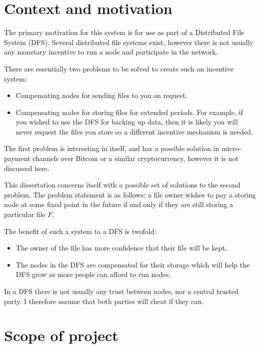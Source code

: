 \documentclass[12pt,a4paper,twoside,openright]{report}
\begin{document}
\section{Context and motivation}

The primary motivation for this system is for use as part of a Distributed File System (DFS).
Several distributed file systems exist, however there is not usually any monetary incentive to run a node and participate in the network.

There are essentially two problems to be solved to create such an incentive system:
\begin{itemize}
\item Compensating nodes for sending files to you on request.

\item Compensating nodes for storing files for extended periods.
For example, if you wished to use the DFS for backing up data, then it is likely you will never request the files you store
so a different incentive mechanism is needed.
\end{itemize}

The first problem is interesting in itself, and has a possible solution in micro-payment channels over Bitcoin or a similar cryptocurrency,
however it is not discussed here.

This dissertation concerns itself with a possible set of solutions to the second problem.
The problem statement is as follows: a file owner wishes to pay a storing node at some fixed point in the future if and only if they are still storing a particular file $F$.

The benefit of such a system to a DFS is twofold:
\begin{itemize}
\item The owner of the file has more confidence that their file will be kept.
\item The nodes in the DFS are compensated for their storage which will help the DFS grow as more people can afford to run nodes.
\end{itemize}

In a DFS there is not usually any trust between nodes, nor a central trusted party.
I therefore assume that both parties will cheat if they can.

\section{Scope of project}\label{intro-scope}
\end{document}
